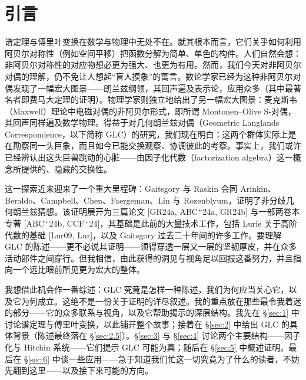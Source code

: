 \section*{引言}\label{sec:0}

谱定理与傅里叶变换在数学与物理中无处不在。就其根本而言，它们关乎如何利用阿贝尔对称性（例如空间平移）把函数分解为简单、单色的构件。人们自然会想：非阿贝尔对称性的对应物想必更为强大、也更为有用。然而，我们今天对非阿贝尔对偶的理解，仍不免让人想起“盲人摸象”的寓言。数论学家已经为这种非阿贝尔对偶发现了一幅宏大图景——朗兰兹纲领，其回声遍及表示论，应用众多（其中最著名者即费马大定理的证明）。物理学家则独立地给出了另一幅宏大图景：麦克斯韦（Maxwell）理论中电磁对偶的非阿贝尔形式，即所谓 Montonen--Olive S-对偶，其回声同样遍及数学物理。得益于对几何朗兰兹对偶（Geometric Langlands Correspondence，以下简称 GLC）的研究，我们现在明白：这两个群体实际上是在勘察同一头巨象，而且如今已能交换观察、协调彼此的考察。事实上，我们或许已经辨认出这头巨兽跳动的心脏——由因子化代数（factorization algebra）这一概念所提供的、隐藏的交换性。

这一探索近来迎来了一个重大里程碑：Gaitsgory 与 Raskin 会同 Arinkin、Beraldo、\mbox{Campbell}、Chen、Faergeman、Lin 与 Rozenblyum，证明了非分歧几何朗兰兹猜想。该证明展开为三篇论文 [GR24a, ABC${}^{+}$24a, GR24b] 与一部两卷本专著 [ABC${}^{+}$24b, CCF${}^{+}$24]，其基础是此前的大量技术工作，包括 Lurie 关于高阶代数的基础 [Lur09, Lur]，以及 Gaitsgory 过去二十年间的许多工作。要理解 GLC 的陈述——更不必说其证明——须得穿透一层又一层的坚韧厚皮，并在众多活动部件之间穿行。但我相信，由此获得的洞见与视角足以回报这番努力，并且指向一个远比眼前所见更为宏大的整体。

我想借此机会作一番综述：GLC 究竟是怎样一种陈述，我们为何应当关心它，以及它为何成立。这绝不是一份关于证明的详尽叙述。我的重点放在那些最令我着迷的部分——它的众多联系与视角，以及它帮助揭示的深层结构。我先在 \S\ref{sec:1} 中讨论谱定理与傅里叶变换，以此铺开整个故事；接着在 \S\ref{sec:2} 中给出 GLC 的具体背景（陈述最终落在 \S\ref{sec:2.5}）。\S\ref{sec:3} 与 \S\ref{sec:4} 讨论两个主要结构——因子化与 Hitchin 系统——它们提示 GLC 可能为真；随后在 \S\ref{sec:5} 中概述证明。最后在 \S\ref{sec:6} 中谈一些应用——急于知道我们忙这一切究竟为了什么的读者，不妨先翻到这里——以及接下来可能的方向。


